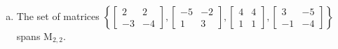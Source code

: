 \begin{exerciseAnswer}
\begin{enumerate}[(a)]
\item The set of matrices \( \left\{ \left[\begin{array}{cc}
2 & 2 \\
-3 & -4
\end{array}\right] , \left[\begin{array}{cc}
-5 & -2 \\
1 & 3
\end{array}\right] , \left[\begin{array}{cc}
4 & 4 \\
1 & 1
\end{array}\right] , \left[\begin{array}{cc}
3 & -5 \\
-1 & -4
\end{array}\right] \right\} \) spans \(\mathrm{M}_{2,2}\). 
\end{enumerate}
    
\end{exerciseAnswer}
    
